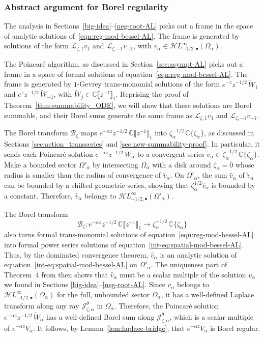 \documentclass{article}
\newcommand{\singexp}[2]{\mathcal{H}L^\infty_{#1, #2}}
\newcommand{\singexpalg}[1]{\singexp{#1}{\bullet}}
\newcommand{\maps}{\colon}
\newcommand{\C}{\mathbb{C}}
\newcommand{\series}[1]{\tilde{#1}}
\newcommand{\laplace}{\mathcal{L}}
\newcommand{\borel}{\mathcal{B}}
\theoremstyle{definition}
\theoremstyle{plain}
\begin{document}
\subsubsection{Abstract argument for Borel regularity}\label{bessel-regularity-AL}
The analysis in Sections~\ref{big-idea}\;--\;\ref{neg-root-AL} picks out a frame in the space of analytic solutions of~\eqref{eqn:reg-mod-bessel-AL}. The frame is generated by solutions of the form $\laplace_{\zeta, 1} v_1$ and $\laplace_{\zeta, -1} v_{-1}$, with $v_\alpha \in \singexpalg{-1/2}(\Omega_\alpha)$.

The Poincar\'{e} algorithm, as discussed in Section~\ref{sec:asympt-AL} picks out a frame in a space of formal solutions of equation~\eqref{eqn:reg-mod-bessel-AL}. The frame is generated by $1$-Gevrey trans-monomial solutions of the form $e^{-z} z^{-1/2}\,\tilde{W}_1$ and $e^z z^{-1/2}\,\tilde{W}_{-1}$, with $\tilde{W}_j \in \C\llbracket z^{-1} \rrbracket_1$. Reprising the proof of Theorem~\ref{thm:summability_ODE}, we will show that these solutions are Borel summable, and their Borel sums generate the same frame as $\laplace_{\zeta, 1} v_1$ and $\laplace_{\zeta, -1} v_{-1}$.

The Borel transform $\borel_\zeta$ maps $e^{-\alpha z} z^{-1/2}\,\C\llbracket z^{-1} \rrbracket_1$ into $\zeta_\alpha^{-1/2}\,\C\{\zeta_\alpha\}$, as discussed in Sections \ref{sec:action_transseries} and \ref{sec:new-summability-proof}. In particular, it sends each Poincar\'{e} solution $e^{-\alpha z} z^{-1/2}\,\series{W}_\alpha$ to a convergent series $\series{v}_\alpha \in \zeta_\alpha^{-1/2}\,\C\{\zeta_\alpha\}$. Make a bounded sector $\Omega'_\alpha$ by intersecting $\Omega_\alpha$ with a disk around $\zeta_\alpha = 0$ whose radius is smaller than the radius of convergence of $\series{v}_\alpha$. On $\Omega'_\alpha$, the sum $\hat{v}_\alpha$ of $\series{v}_\alpha$ can be bounded by a shifted geometric series, showing that $\zeta_\alpha^{1/2} \hat{v}_\alpha$ is bounded by a constant. Therefore, $\hat{v}_\alpha$ belongs to $\singexpalg{-1/2}(\Omega'_\alpha)$.

The Borel transform
\[ \borel_\zeta \maps e^{-\alpha z} z^{-1/2}\,\C\llbracket z^{-1} \rrbracket_1 \to \zeta_\alpha^{-1/2}\,\C\{\zeta_\alpha\} \]
also turns formal trans-monomial solutions of equation~\eqref{eqn:reg-mod-bessel-AL} into formal power series solutions of equation~\eqref{int-eq:spatial-mod-bessel-AL}. Thus, by the dominated convergence theorem, $\hat{v}_\alpha$ is an analytic solution of equation~\eqref{int-eq:spatial-mod-bessel-AL} on $\Omega'_\alpha$. The uniqueness part of Theorem~4 from \cite{reg-sing-volterra} then shows that $\hat{v}_\alpha$ must be a scalar multiple of the solution $v_\alpha$ we found in Sections \ref{big-idea}\;--\;\ref{neg-root-AL}. Since $v_\alpha$ belongs to $\singexpalg{-1/2}(\Omega_\alpha)$ for the full, unbounded sector $\Omega_\alpha$, it has a well-defined Laplace transform along any ray $\mathcal{J}^\theta_{\zeta, \alpha}$ in $\Omega_\alpha$. Therefore, the Poincar\'{e} solution $e^{-\alpha z} z^{-1/2}\,\series{W}_\alpha$ has a well-defined Borel sum along $\mathcal{J}^\theta_{\zeta, \alpha}$, which is a scalar multiple of $e^{-\alpha z} V_\alpha$. It follows, by Lemma~\ref{lem:laplace-bridge}, that $e^{-\alpha z} V_\alpha$ is Borel regular.
%
\end{document}
